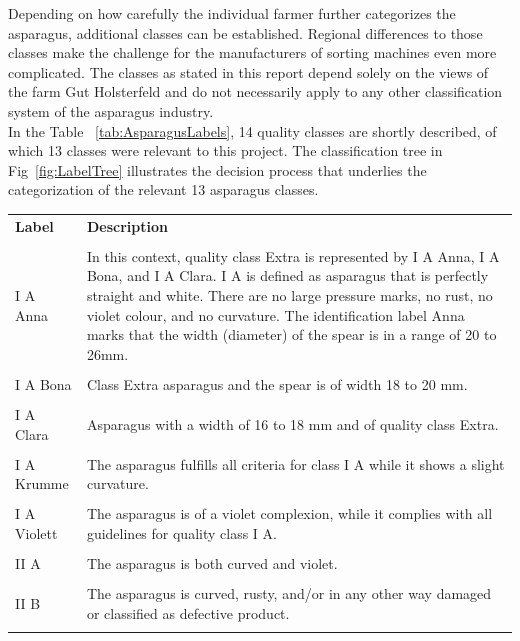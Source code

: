 Depending on how carefully the individual farmer further categorizes the asparagus, additional classes can be established. Regional differences to those classes make the challenge for the manufacturers of sorting machines even more complicated. The classes as stated in this report depend solely on the views of the farm Gut Holsterfeld and do not necessarily apply to any other classification system of the asparagus industry. \\
In the Table ~\ref{tab:AsparagusLabels}, 14 quality classes are shortly described, of which 13 classes were relevant to this project. The classification tree in Fig~\ref{fig:LabelTree} illustrates the decision process that underlies the categorization of the relevant 13 asparagus classes.

\begin{table}[H]
	\centering
	\begin{tabular}{l p{11cm}}
		\textbf{Label} & \textbf{Description} \\
		\noalign{\smallskip}
		\hline
		\\
		I A Anna & In this context, quality class Extra is represented by I A Anna, I A 	 		Bona, and I A Clara. I A is defined as asparagus that is perfectly straight and 		 		white. There are no large pressure marks, no rust, no violet colour, and no  	  	   		curvature. The identification label Anna marks that the width (diameter) of the  	 		spear is in a range of 20 to 26mm. \\
		\\
		I A Bona & Class Extra asparagus and the spear is of width 18 to 20 mm. \\
		\\
		I A Clara & Asparagus with a width of 16 to 18 mm and of quality class Extra. \\
		\\
		I A Krumme & The asparagus fulfills all criteria for class I A while it shows a 				slight curvature. \\
		\\
		I A Violett & The asparagus is of a violet complexion, while it complies with all 			guidelines for quality class I A. \\
		\\
		II A & The asparagus is both curved and violet. \\
		\\
		II B & The asparagus is curved, rusty, and/or in any other way damaged or 					classified as defective product. \\
		\\

\end{tabular}
\end{table}
